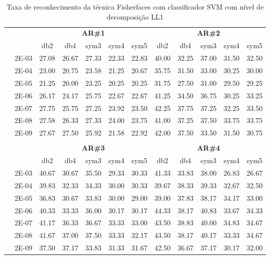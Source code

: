 


\begin{table}[H]
	\centering
    \normalsize
	\caption{Taxa de reconhecimento da técnica Fisherfaces com classificador SVM com nível de decomposição LL1}
	\begin{tabular}{|c|c|c c c c c|c c c c c|}
\cline{3-12}
\multicolumn{2}{c|}{\multirow{2}{*}{}} & \multicolumn{5}{c|}{\textbf{AR\#1}}  & \multicolumn{5}{c|}{\textbf{AR\#2}} \\\cline{3-12}

\multicolumn{2}{c|}{}  & db2 & db4 & sym3 & sym4 & sym5 & db2 & db4& sym3 & sym4 & sym5 \\\hline
\multicolumn{1}{|c|}{ \multirow{6}{*}{\rotatebox[origin=c]{90}{\textbf{Gamma}}} }
&2E-03&	27.08&	26.67&	27.33&	22.33&	22.83&	40.00&	32.25&	37.00&	31.50&	32.50	\\\cline{2-12}
&2E-04&	23.00&	20.75&	23.58&	21.25&	20.67&	35.75&	31.50&	33.00&	30.25&	30.00	\\\cline{2-12}
&2E-05&	21.25&	20.00&	23.25&	20.25&	20.25&	31.75&	27.50&	31.00&	29.50&	29.25	\\\cline{2-12}
&2E-06&	26.17&	24.17&	25.75&	22.67&	22.67&	41.25&	34.50&	36.75&	30.25&	33.25	\\\cline{2-12}
&2E-07&	27.75&	25.75&	27.25&	23.92&	23.50&	42.25&	37.75&	37.25&	32.25&	33.50	\\\cline{2-12}
&2E-08&	27.58&	26.33&	27.33&	24.00&	23.75&	41.00&	37.25&	37.50&	33.75&	33.75	\\\cline{2-12}
&2E-09&	27.67&	27.50&	25.92&	21.58&	22.92&	42.00&	37.50&	33.50&	31.50&	30.75	

\\ \midrule
\multicolumn{12}{c}{}\\ 

\cline{3-12}
\multicolumn{2}{c}{} & \multicolumn{5}{|c|}{\textbf{AR\#3}}  & \multicolumn{5}{c|}{\textbf{AR\#4}} \\\cline{3-12}
\multicolumn{2}{c}{}  & \multicolumn{1}{|c}{db2} & db4 & sym3 & sym4 & sym5 & db2 & db4& sym3 & sym4 & sym5 \\\hline
\multicolumn{1}{|c|}{ \multirow{6}{*}{\rotatebox[origin=c]{90}{\textbf{Gamma}}} }
&2E-03&	40.67&	30.67&	35.50&	29.33&	30.33&	41.33&	33.83&	38.00&	26.83&	26.67	\\\cline{2-12}
&2E-04&	39.83&	32.33&	34.33&	30.00&	30.33&	39.67&	38.33&	39.33&	32.67&	32.50	\\\cline{2-12}
&2E-05&	36.83&	30.67&	33.83&	30.00&	29.00&	39.00&	37.83&	38.17&	34.17&	33.00	\\\cline{2-12}
&2E-06&	40.33&	33.33&	36.00&	30.17&	30.17&	44.33&	38.17&	40.83&	33.67&	34.33	\\\cline{2-12}
&2E-07&	41.17&	36.33&	36.67&	33.33&	33.00&	43.50&	38.83&	40.00&	34.83&	34.67	\\\cline{2-12}
&2E-08&	41.67&	37.00&	37.50&	33.33&	32.17&	43.50&	38.17&	40.17&	33.33&	34.67	\\\cline{2-12}
&2E-09&	37.50&	37.17&	33.83&	31.33&	31.67&	42.50&	36.67&	37.17&	30.17&	32.00	


\end{tabular}
\end{table}
